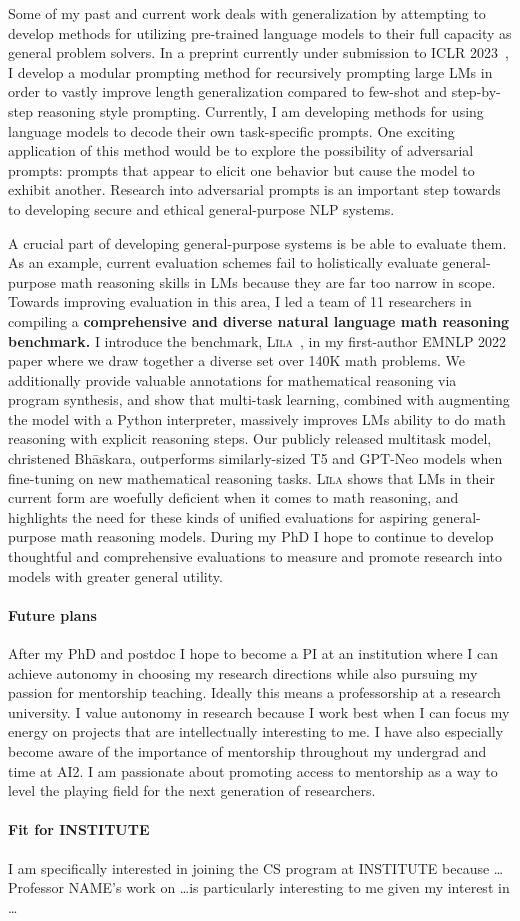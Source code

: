 \documentclass[11pt]{article}
\newcommand\lila{\textsc{L\={\i}la}\xspace}
\newcommand\inst{INSTITUTE\xspace}
\begin{document}
Some of my past and current work deals with generalization 
by attempting to develop methods for utilizing pre-trained language models
to their full capacity as general problem solvers.
In a preprint currently under submission to ICLR 2023~\cite{Khot2022DecomposedPA},
I develop a modular prompting method for recursively prompting large LMs 
in order to vastly improve length generalization 
compared to few-shot and step-by-step reasoning style prompting.
Currently, I am developing methods for using language models 
to decode their own task-specific prompts.
One exciting application of this method would be to explore 
the possibility of adversarial prompts: 
prompts that appear to elicit one behavior 
but cause the model to exhibit another.
Research into adversarial prompts 
is an important step towards to developing 
secure and ethical general-purpose NLP systems. 

A crucial part of developing general-purpose systems is be able to evaluate them.
As an example, 
current evaluation schemes fail to holistically evaluate 
general-purpose math reasoning skills in LMs
because they are far too narrow in scope.
Towards improving evaluation in this area, 
I led a team of 11 researchers in compiling a
\textbf{comprehensive and diverse natural language math reasoning benchmark.} 
I introduce the benchmark, \lila~\cite{Mishra2022Lila}, 
in my first-author EMNLP 2022 paper
where we draw together a diverse set over 140K math problems.
We additionally provide valuable annotations for mathematical reasoning via program synthesis, 
and show that multi-task learning, 
combined with augmenting the model with a Python interpreter,
massively improves LMs ability to do math reasoning 
with explicit reasoning steps.
Our publicly released multitask model, christened Bh\=askara, 
outperforms similarly-sized T5 and GPT-Neo models
when fine-tuning on new mathematical reasoning tasks.
\lila shows that LMs 
in their current form 
are woefully deficient when it comes to math reasoning,
and highlights the need for these kinds of unified evaluations for 
aspiring general-purpose math reasoning models.
During my PhD I hope to continue to develop thoughtful and comprehensive evaluations 
to measure and promote research into models with greater general utility.

\paragraph{Future plans}
After my PhD and postdoc I hope to become a PI 
at an institution where I can achieve autonomy in choosing my research directions
while also pursuing my passion for mentorship teaching.
Ideally this means a professorship at a research university.
I value autonomy in research because I work best 
when I can focus my energy on projects 
that are intellectually interesting to me.
I have also especially become aware of the importance of mentorship 
throughout my undergrad and time at AI2.
I am passionate about promoting access to mentorship 
as a way to level the playing field 
for the next generation of researchers.

\paragraph{Fit for \inst} I am specifically interested in joining the CS program at 
\inst because \ldots Professor NAME's work on \ldots is particularly interesting to me given my interest in \ldots



\end{document}
